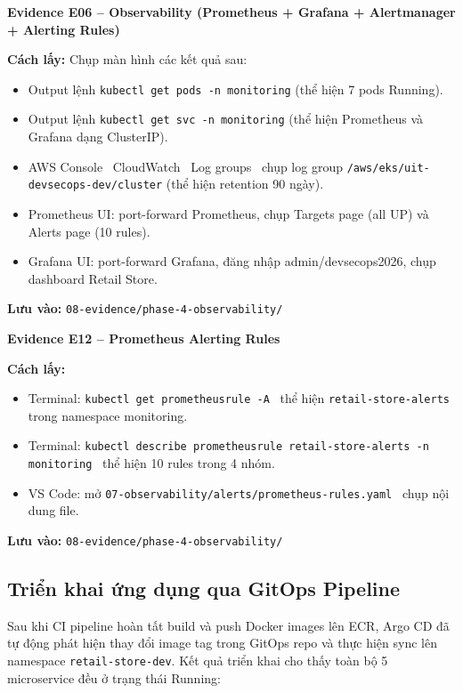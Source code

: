 \documentclass[13pt,a4paper,twoside]{extarticle}
\newcommand{\evidence}[1]{%
  \begin{evidencebox}
  #1
  \end{evidencebox}
}
\begin{document}
\evidence{
\textbf{Evidence E06 -- Observability (Prometheus + Grafana + Alertmanager + Alerting Rules)}

\smallskip
\textbf{Cách lấy:} Chụp màn hình các kết quả sau:
\begin{itemize}[leftmargin=*,nosep]
  \item Output lệnh \texttt{kubectl get pods -n monitoring} (thể hiện 7 pods Running).
  \item Output lệnh \texttt{kubectl get svc -n monitoring} (thể hiện Prometheus và Grafana dạng ClusterIP).
  \item AWS Console \textrightarrow\ CloudWatch \textrightarrow\ Log groups \textrightarrow\ chụp log group \texttt{/aws/eks/uit-devsecops-dev/cluster} (thể hiện retention 90 ngày).
  \item Prometheus UI: port-forward Prometheus, chụp Targets page (all UP) và Alerts page (10 rules).
  \item Grafana UI: port-forward Grafana, đăng nhập admin/devsecops2026, chụp dashboard Retail Store.
\end{itemize}
\textbf{Lưu vào:} \texttt{08-evidence/phase-4-observability/}
}

\evidence{
\textbf{Evidence E12 -- Prometheus Alerting Rules}

\smallskip
\textbf{Cách lấy:}
\begin{itemize}[leftmargin=*,nosep]
  \item Terminal: \texttt{kubectl get prometheusrule -A} \textrightarrow\ thể hiện \texttt{retail-store-alerts} trong namespace monitoring.
  \item Terminal: \texttt{kubectl describe prometheusrule retail-store-alerts -n monitoring} \textrightarrow\ thể hiện 10 rules trong 4 nhóm.
  \item VS Code: mở \texttt{07-observability/alerts/prometheus-rules.yaml} \textrightarrow\ chụp nội dung file.
\end{itemize}
\textbf{Lưu vào:} \texttt{08-evidence/phase-4-observability/}
}

\subsection{Triển khai ứng dụng qua GitOps Pipeline}

Sau khi CI pipeline hoàn tất build và push Docker images lên ECR, Argo CD đã tự động phát hiện thay đổi image tag trong GitOps repo và thực hiện sync lên namespace \texttt{retail-store-dev}. Kết quả triển khai cho thấy toàn bộ 5 microservice đều ở trạng thái Running:
\end{document}
